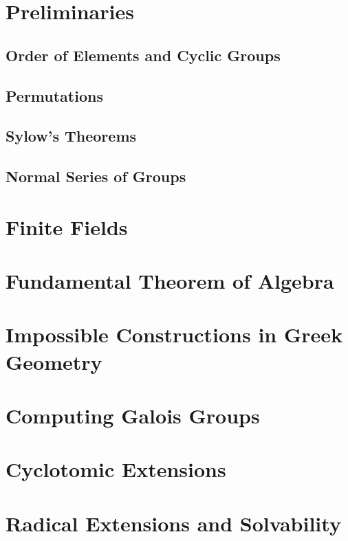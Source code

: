 \documentclass[oneside]{book}
\theoremstyle{lemmastyle}
\theoremstyle{definitionstyle}
\theoremstyle{exercisestyle}
\theoremstyle{claimstyle}
\newcommand{\<}{\langle}
\renewcommand{\>}{\rangle}
\begin{document}
    \chapter{Preliminaries}
        
        \section{Order of Elements and Cyclic Groups}
            
        
        \section{Permutations}
            
        
        \section{Sylow's Theorems}
            
            
        \section{Normal Series of Groups}
            
            
    \chapter{Finite Fields}
        
    
    \chapter{Fundamental Theorem of Algebra}
        
    
    \chapter{Impossible Constructions in Greek Geometry}
        
        
    \chapter{Computing Galois Groups}
        
    
    \chapter{Cyclotomic Extensions}
        

    \chapter{Radical Extensions and Solvability}
        

    
\end{document}
